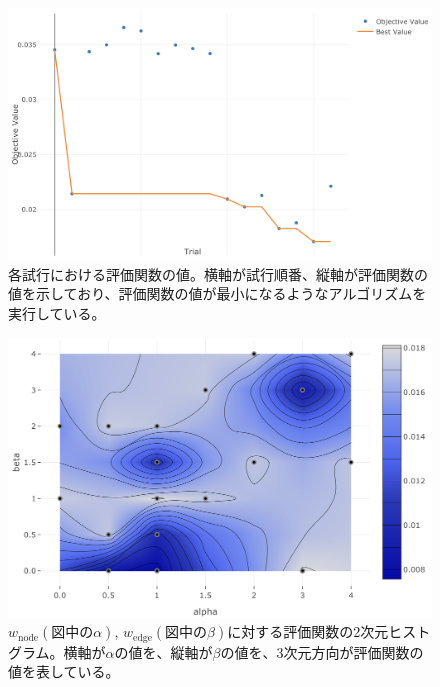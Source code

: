 \begin{figure}[H]
	\begin{center}
 \includegraphics[keepaspectratio, scale=0.3]
 	{Figure/Flavortagging/bayesian1.png}
 		\caption[各試行における評価関数の値]{各試行における評価関数の値。横軸が試行順番、縦軸が評価関数の値を示しており、評価関数の値が最小になるようなアルゴリズムを実行している。}
 		\label{bayes1}
	\end{center}
\end{figure}
\begin{figure}[H]
	\begin{center}
 \includegraphics[keepaspectratio, scale=0.3]
 	{Figure/Flavortagging/bayesian2.png}
 		\caption[評価関数の2次元ヒストグラム]{$w_{\mathrm{node}} (図中の\alpha)$, $w_{\mathrm{edge}} (図中の\beta)$に対する評価関数の2次元ヒストグラム。横軸が$\alpha$の値を、縦軸が$\beta$の値を、3次元方向が評価関数の値を表している。}
 		\label{bayes2}
	\end{center}
\end{figure}
